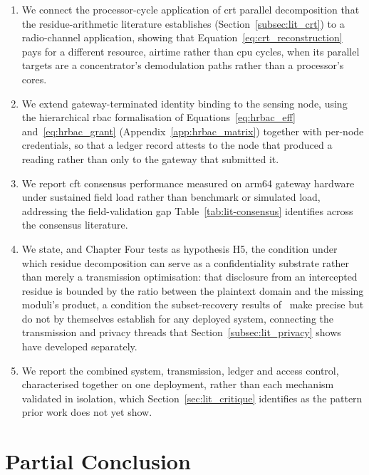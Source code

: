 \begin{enumerate}
  \item We connect the processor-cycle application of \gls{crt} parallel
        decomposition that the residue-arithmetic literature establishes
        (Section~\ref{subsec:lit_crt}) to a radio-channel application,
        showing that Equation~\ref{eq:crt_reconstruction} pays for a
        different resource, airtime rather than \gls{cpu} cycles, when its
        parallel targets are a concentrator's demodulation paths rather
        than a processor's cores.
  \item We extend gateway-terminated identity binding to the sensing
        node, using the hierarchical \gls{rbac} formalisation of
        Equations~\ref{eq:hrbac_eff} and~\ref{eq:hrbac_grant}
        (Appendix~\ref{app:hrbac_matrix}) together with per-node
        credentials, so that a ledger record attests to the node that
        produced a reading rather than only to the gateway that submitted
        it.
  \item We report \gls{cft} consensus performance measured on \gls{arm64}
        gateway hardware under sustained field load rather than benchmark
        or simulated load, addressing the field-validation gap
        Table~\ref{tab:lit-consensus} identifies across the consensus
        literature.
  \item We state, and Chapter Four tests as hypothesis H5, the condition
        under which residue decomposition can serve as a confidentiality
        substrate rather than merely a transmission optimisation: that
        disclosure from an intercepted residue is bounded by the ratio
        between the plaintext domain and the missing moduli's product, a
        condition the subset-recovery results
        of~\cite{goldreich1999china, shoup2009computational} make precise
        but do not by themselves establish for any deployed system,
        connecting the transmission and privacy threads that
        Section~\ref{subsec:lit_privacy} shows have developed
        separately.
  \item We report the combined system, transmission, ledger and access
        control, characterised together on one deployment, rather than
        each mechanism validated in isolation, which
        Section~\ref{sec:lit_critique} identifies as the pattern prior
        work does not yet show.
\end{enumerate}

\section{Partial Conclusion}
\label{sec:lit_partial_conclusion}

